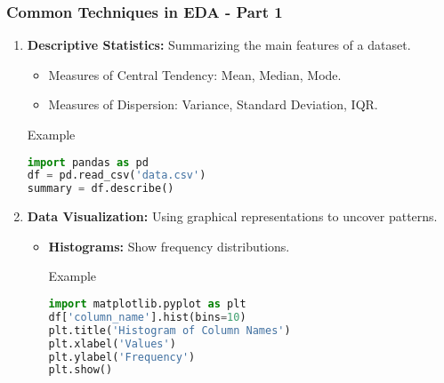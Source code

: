 \documentclass{beamer}
\begin{document}
\begin{frame}[fragile]
    \frametitle{Common Techniques in EDA - Part 1}
    \begin{enumerate}
        \item \textbf{Descriptive Statistics:} Summarizing the main features of a dataset.
        \begin{itemize}
            \item Measures of Central Tendency: Mean, Median, Mode.
            \item Measures of Dispersion: Variance, Standard Deviation, IQR.
        \end{itemize}
        \begin{block}{Example}
        \begin{lstlisting}[language=Python]
import pandas as pd
df = pd.read_csv('data.csv')
summary = df.describe()
        \end{lstlisting}
        \end{block}
        
        \item \textbf{Data Visualization:} Using graphical representations to uncover patterns.
        \begin{itemize}
            \item \textbf{Histograms:} Show frequency distributions.
            \begin{block}{Example}
            \begin{lstlisting}[language=Python]
import matplotlib.pyplot as plt
df['column_name'].hist(bins=10)
plt.title('Histogram of Column Names')
plt.xlabel('Values')
plt.ylabel('Frequency')
plt.show()
            \end{lstlisting}
            \end{block}
        \end{itemize}
    \end{enumerate}
\end{frame}
\end{document}
